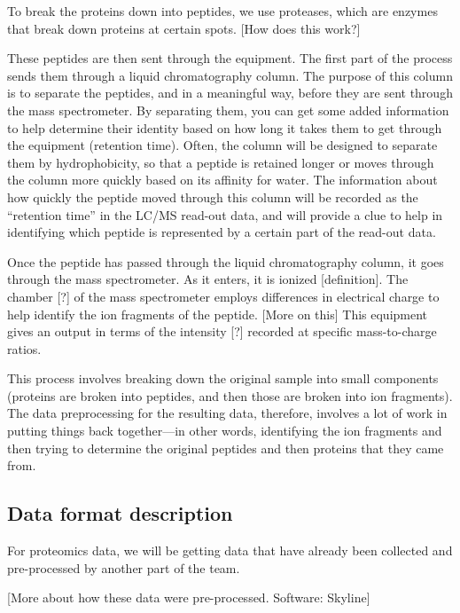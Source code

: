 \documentclass[
]{book}
\begin{document}
To break the proteins down into peptides, we use proteases, which are enzymes
that break down proteins at certain spots. {[}How does this work?{]}

These peptides are then sent through the equipment. The first part of the
process sends them through a liquid chromatography column. The purpose of
this column is to separate the peptides, and in a meaningful way, before
they are sent through the mass spectrometer. By separating them, you
can get some added information to help determine their identity based on
how long it takes them to get through the equipment (retention time).
Often, the column will be designed to separate them by hydrophobicity,
so that a peptide is retained longer or moves through the column more
quickly based on its affinity for water. The information about how
quickly the peptide moved through this column will be recorded as the
``retention time'' in the LC/MS read-out data, and will provide a clue to
help in identifying which peptide is represented by a certain part of the
read-out data.

Once the peptide has passed through the liquid chromatography column,
it goes through the mass spectrometer. As it enters, it is ionized
{[}definition{]}. The chamber {[}?{]} of the mass spectrometer employs
differences in electrical charge to help identify the ion fragments
of the peptide. {[}More on this{]} This equipment gives an output in terms
of the intensity {[}?{]} recorded at specific mass-to-charge ratios.

This process involves breaking down the original sample into small
components (proteins are broken into peptides, and then those are
broken into ion fragments). The data preprocessing for the resulting
data, therefore, involves a lot of work in putting things back
together---in other words, identifying the ion fragments and then
trying to determine the original peptides and then proteins that
they came from.

\hypertarget{data-format-description}{%
\subsection{Data format description}\label{data-format-description}}

For proteomics data, we will be getting data that have already been collected and
pre-processed by another part of the team.

{[}More about how these data were pre-processed. Software: Skyline{]}
\end{document}
